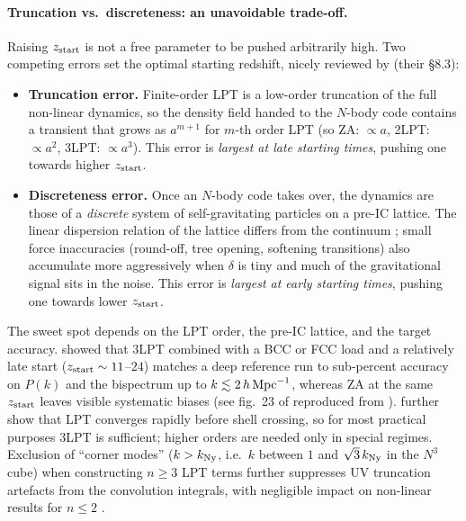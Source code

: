 \documentclass[12pt]{article}
\begin{document}
\paragraph{Truncation vs.\ discreteness: an unavoidable trade-off.}
Raising $z_{\rm start}$ is not a free parameter to be pushed arbitrarily
high.  Two competing errors set the optimal starting redshift, nicely
reviewed by \citet{Angulo2022} (their \S8.3):
%
\begin{itemize}
  \item \textbf{Truncation error.}  Finite-order LPT is a low-order
    truncation of the full non-linear dynamics, so the density field
    handed to the $N$-body code contains a transient that grows as
    $a^{m+1}$ for $m$-th order LPT (so ZA: $\propto a$, 2LPT:
    $\propto a^2$, 3LPT: $\propto a^3$).  This error is
    \emph{largest at late starting times}, pushing one towards higher
    $z_{\rm start}$.
  \item \textbf{Discreteness error.}  Once an $N$-body code takes over,
    the dynamics are those of a \emph{discrete} system of
    self-gravitating particles on a pre-IC lattice.  The linear
    dispersion relation of the lattice differs from the continuum
    \citep{MarcosEtal2006,Garrison2016}; small force inaccuracies
    (round-off, tree opening, softening transitions) also accumulate
    more aggressively when $\delta$ is tiny and much of the
    gravitational signal sits in the noise.  This error is
    \emph{largest at early starting times}, pushing one towards lower
    $z_{\rm start}$.
\end{itemize}
%
The sweet spot depends on the LPT order, the pre-IC lattice, and the
target accuracy.  \citet{Michaux2020} showed that 3LPT combined with a
BCC or FCC load and a relatively late start ($z_{\rm start} \sim 11$--$24$)
matches a deep reference run to sub-percent accuracy on $P(k)$ and the
bispectrum up to $k \lesssim 2\,h\,{\rm Mpc}^{-1}$, whereas ZA at the
same $z_{\rm start}$ leaves visible systematic biases (see fig.~23 of
\citealt{Angulo2022} reproduced from \citealt{Michaux2020}).
\citet{RampfHahn2021} further show that LPT converges rapidly before
shell crossing, so for most practical purposes 3LPT is sufficient;
higher orders are needed only in special regimes.  Exclusion of
``corner modes'' ($k > k_{\rm Ny}$, i.e.\ $k$ between $1$ and
$\sqrt{3}\,k_{\rm Ny}$ in the $N^3$ cube) when constructing $n \ge 3$
LPT terms further suppresses UV truncation artefacts from the
convolution integrals, with negligible impact on non-linear results
for $n \le 2$ \citep{RampfHahn2021,Falck2017}.
\end{document}

